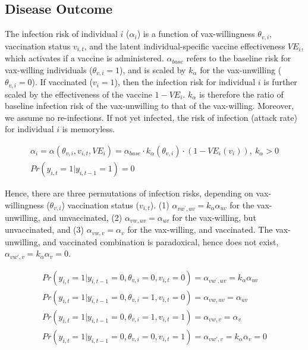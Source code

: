 \documentclass[12pt]{article}
\begin{document}
\subsection{Disease Outcome}
The infection risk of individual $i$ ($\alpha_{i}$) is a function of vax-willingness $\theta_{v, i}$, vaccination status $v_{i, t}$, and the latent individual-specific vaccine effectiveness ${VE}_{i}$, which activates if a vaccine is administered. $\alpha_{base}$ refers to the baseline risk for vax-willing individuals ($\theta_{v, i} = 1$), and is scaled by $k_{\alpha}$ for the vax-unwilling ($\theta_{v, i} = 0$). If vaccinated ($v_{i}=1$), then the infection risk for individual $i$ is further scaled by the effectiveness of the vaccine $1 - VE_{i}$. $k_{\alpha}$ is therefore the ratio of baseline infection risk of the vax-unwilling to that of the vax-willing. Moreover, we assume no re-infections. If not yet infected, the risk of infection (attack rate) for individual $i$ is memoryless.

\begin{eqnarray}
	\alpha_{i} = \alpha(\theta_{v, i}, v_{i, t}, {VE}_{i}) = \alpha_{base} \cdot k_{\alpha}(\theta_{v, i}) \cdot (1 - VE_{i}(v_{i})), \ k_{\alpha} > 0 \\
	Pr(y_{i,t}=1 | y_{i,t-1}=1) = 0
\end{eqnarray}

Hence, there are three permutations of infection risks, depending on vax-willingness ($\theta_{v, i}$) vaccination status ($v_{i,t}$). (1) $\alpha_{vw^{'}, uv} = k_\alpha \alpha_{uv}$ for the vax-unwilling, and unvaccinated, (2) $\alpha_{vw, uv} = \alpha_{uv}$ for the vax-willing, but unvaccinated, and (3) $\alpha_{vw, v} = \alpha_{v}$ for the vax-willing, and vaccinated. The vax-unwilling, and vaccinated combination is paradoxical, hence does not exist, $\alpha_{vw', v} = k_\alpha \alpha_{v} = 0$.

\begin{eqnarray}
	Pr(y_{i,t}=1 | y_{i,t-1}=0, \theta_{v, i} = 0,v_{i,t} = 0) = \alpha_{vw^{'}, uv} = k_\alpha \alpha_{uv} \\ 
	Pr(y_{i,t}=1 | y_{i,t-1}=0, \theta_{v, i} = 1,v_{i,t} = 0) = \alpha_{vw, uv} = \alpha_{uv} \\
	Pr(y_{i,t}=1 | y_{i,t-1}=0, \theta_{v, i} = 1,v_{i,t} = 1) = \alpha_{vw, v} = \alpha_{v} \\ 
	Pr(y_{i,t}=1 | y_{i,t-1}=0, \theta_{v, i} = 0,v_{i,t} = 1) = \alpha_{vw', v} = k_\alpha \alpha_{v} = 0 
\end{eqnarray}
\end{document}
